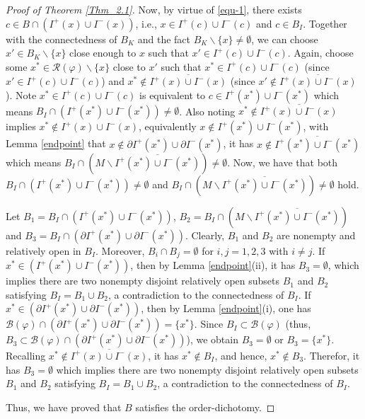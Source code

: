 \documentclass[a4paper,11pt]{article}
\theoremstyle{plain}
\theoremstyle{definition}
\numberwithin{equation}{section}
\begin{document}
\begin{proof}[Proof of Theorem \ref{Thm_2.1}]
		Now, by virtue of \eqref{equ-1}, there exists $c\in B\cap (I^+(x)\cup I^-(x))$, i.e., $x\in I^+(c)\cup I^-(c)$ and $c\in B_{I}$. Together with the connectedness of $B_{K}$ and the fact $B_{K}\backslash \{x\}\neq \emptyset$, we can choose $x'\in B_{K}\backslash\{x\}$ close enough to $x$ such that $x'\in I^+(c)\cup I^-(c)$.
		Again, choose some $x^{*}\in \mathcal{R}(\varphi)\backslash\{x\}$ close to $x'$ such that $x^{*}\in I^+(c)\cup I^-(c)$ (since $x'\in I^+(c)\cup I^-(c)$) and $x^{*}\notin \overline{I^+(x)\cup I^-(x)}$ (since  $x'\notin \overline{I^+(x)\cup I^-(x)}$). 
		Note $x^{*}\in I^+(c)\cup I^-(c)$ is equivalent to $c\in I^+(x^{*})\cup I^-(x^{*})$ which means $B_I\cap (I^+(x^{*})\cup I^-(x^{*}))\neq\emptyset$. Also noting $x^{*}\notin \overline{I^+(x)\cup I^-(x)}$ implies $x^{*}\notin I^+(x)\cup I^-(x)$, equivalently $x\notin I^+(x^{*})\cup I^-(x^{*})$, with Lemma \ref{endpoint} that $x\notin \partial  I^{+}(x^{*})\cup \partial  I^{-}(x^{*})$, it has $x\notin \overline{I^+(x^{*})\cup I^-(x^{*})}$ which means $B_I\cap (M\backslash \overline{I^+(x^{*})\cup I^-(x^{*})})\neq\emptyset$. 
		Now, we have that both $B_I\cap (I^+(x^{*})\cup I^-(x^{*}))\neq\emptyset$ and $B_I\cap (M\backslash \overline{I^+(x^{*})\cup I^-(x^{*})})\neq\emptyset$ hold.

        
        Let $B_1=B_{I}\cap  (I^+(x^{*})\cup I^-(x^{*}))$, $B_2=B_{I}\cap (M\backslash\overline{I^+(x^{*})\cup I^-(x^{*})})$ and $B_3=B_{I}\cap  (\partial I^+(x^{*})\cup \partial I^-(x^{*}))$. Clearly, $B_1$ and $B_2$ are nonempty and relatively open in $B_I$. Moreover, $B_i\cap B_j=\emptyset$ for $i,j=1,2,3$ with $i\neq j$.
        If $x^{*}\in (I^+(x^{*})\cup I^-(x^{*}))$, then by Lemma \ref{endpoint}(ii), it has $B_3 = \emptyset$, which implies there are two nonempty disjoint relatively open subsets $B_1$ and $B_2$ satisfying $B_{I}=B_1\cup B_2$, a contradiction to the connectedness of $B_{I}$. 
        If $x^{*}\in (\partial I^+(x^{*})\cup \partial I^-(x^{*}))$, then by Lemma \ref{endpoint}(i), one has $\mathcal{B}(\varphi)\cap (\partial  I^{+}(x^{*})\cup \partial  I^{-}(x^{*}))=\{x^{*}\}$. Since $B_I\subset \mathcal{B}(\varphi)$ (thus, $B_3\subset\mathcal{B}(\varphi)\cap (\partial  I^{+}(x^{*})\cup \partial  I^{-}(x^{*}))$), we obtain $B_3 =\emptyset$ or $B_3=\{x^{*}\}$. Recalling $x^{*}\notin \overline{I^+(x)\cup I^-(x)}$, it has $x^{*}\notin B_I$, and hence, $x^{*}\notin B_3$. Therefor, it has $B_3=\emptyset$ which implies there are two nonempty disjoint relatively open subsets $B_1$ and $B_2$ satisfying $B_{I}=B_1\cup B_2$, a contradiction to the connectedness of $B_{I}$.
        
		
        Thus, we have proved that $B$ satisfies the order-dichotomy.
	\end{proof}
	
\end{document}
